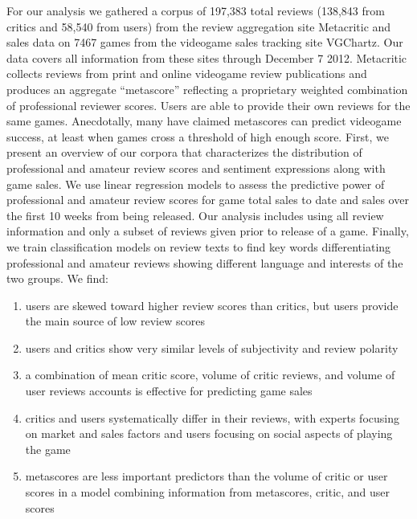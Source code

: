 \documentclass[letterpaper]{article}
\begin{document}
For our analysis we gathered a corpus of 197,383 total reviews (138,843 from critics and 58,540 from users) from the review aggregation site Metacritic and sales data on 7467 games from the videogame sales tracking site VGChartz. Our data covers all information from these sites through December 7 2012. Metacritic collects reviews from print and online videogame review publications and produces an aggregate ``metascore'' reflecting a proprietary weighted combination of professional reviewer scores. Users are able to provide their own reviews for the same games. Anecdotally, many have claimed metascores can predict videogame success, at least when games cross a threshold of high enough score. First, we present an overview of our corpora that characterizes the distribution of professional and amateur review scores and sentiment expressions along with game sales. We use linear regression models to assess the predictive power of professional and amateur review scores for game total sales to date and sales over the first 10 weeks from being released. Our analysis includes using all review information and only a subset of reviews given prior to release of a game. Finally, we train classification models on review texts to find key words differentiating professional and amateur reviews showing different language and interests of the two groups. We find:
\begin{enumerate}
\item users are skewed toward higher review scores than critics, but users provide the main source of low review scores
\item users and critics show very similar levels of subjectivity and review polarity
\item a combination of mean critic score, volume of critic reviews, and volume of user reviews accounts is effective for predicting game sales
\item critics and users systematically differ in their reviews, with experts focusing on market and sales factors and users focusing on social aspects of playing the game
\item metascores are less important predictors than the volume of critic or user scores in a model combining information from metascores, critic, and user scores
\end{enumerate}
\end{document}

